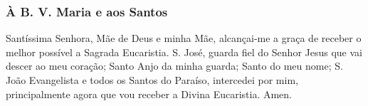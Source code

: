 \subsubsection{À B. V. Maria e aos Santos}

 Santíssima Senhora, Mãe de Deus e minha Mãe, alcançai-me a graça de receber o melhor possível a Sagrada Eucaristia. S. José, guarda fiel do Senhor Jesus que vai descer ao meu coração; Santo Anjo da minha guarda; Santo do meu nome; S. João Evangelista e todos os Santos do Paraíso, intercedei por mim, principalmente agora que vou receber a Divina Eucaristia. Amen.
